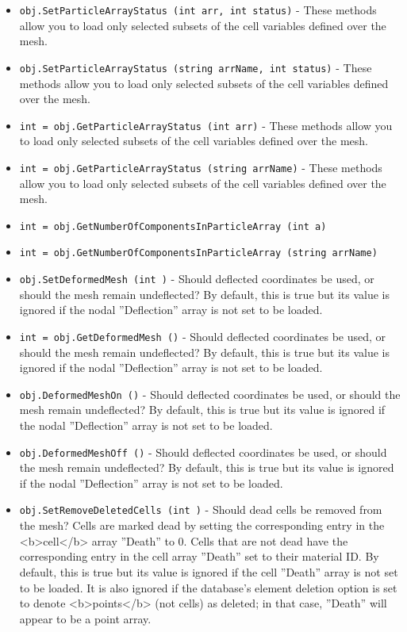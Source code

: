 \begin{itemize}
\item  \verb|obj.SetParticleArrayStatus (int arr, int status)| -  These methods allow you to load only selected subsets of the cell
 variables defined over the mesh.

\item  \verb|obj.SetParticleArrayStatus (string arrName, int status)| -  These methods allow you to load only selected subsets of the cell
 variables defined over the mesh.

\item  \verb|int = obj.GetParticleArrayStatus (int arr)| -  These methods allow you to load only selected subsets of the cell
 variables defined over the mesh.

\item  \verb|int = obj.GetParticleArrayStatus (string arrName)| -  These methods allow you to load only selected subsets of the cell
 variables defined over the mesh.

\item  \verb|int = obj.GetNumberOfComponentsInParticleArray (int a)|

\item  \verb|int = obj.GetNumberOfComponentsInParticleArray (string arrName)|

\item  \verb|obj.SetDeformedMesh (int )| -  Should deflected coordinates be used, or should the mesh remain
 undeflected?  By default, this is true but its value is ignored if the
 nodal ''Deflection'' array is not set to be loaded.

\item  \verb|int = obj.GetDeformedMesh ()| -  Should deflected coordinates be used, or should the mesh remain
 undeflected?  By default, this is true but its value is ignored if the
 nodal ''Deflection'' array is not set to be loaded.

\item  \verb|obj.DeformedMeshOn ()| -  Should deflected coordinates be used, or should the mesh remain
 undeflected?  By default, this is true but its value is ignored if the
 nodal ''Deflection'' array is not set to be loaded.

\item  \verb|obj.DeformedMeshOff ()| -  Should deflected coordinates be used, or should the mesh remain
 undeflected?  By default, this is true but its value is ignored if the
 nodal ''Deflection'' array is not set to be loaded.

\item  \verb|obj.SetRemoveDeletedCells (int )| -  Should dead cells be removed from the mesh?  Cells are marked dead by
 setting the corresponding entry in the <b>cell</b> array ''Death'' to 0.
 Cells that are not dead have the corresponding entry in the cell array
 ''Death'' set to their material ID.  By default, this is true but its
 value is ignored if the cell ''Death'' array is not set to be loaded.
 It is also ignored if the database's element deletion option is set to
 denote <b>points</b> (not cells) as deleted; in that case, ''Death''
 will appear to be a point array.


\end{itemize}
